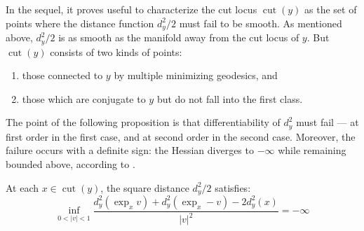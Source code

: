 In the sequel, it proves useful to characterize the cut locus \( \operatorname { cut } ( y ) \) as
the set of points where the distance function \( d _ { y } ^ { 2 } / 2 \) must fail to be smooth.
As mentioned above,
\( d _ { y } ^ { 2 } / 2 \) is as smooth as the manifold away from the cut locus of \( y \).
But \( \operatorname{cut} ( y ) \) consists of two kinds of points:
\begin{enumerate}
	\item those connected to \( y \) by multiple minimizing geodesics, and
	\item	those which are conjugate to \( y \) but do not fall into the first class.
\end{enumerate}
The point of the following proposition \cite[Proposition 2.5]{cordero2001riemannian}
is that differentiability of \( d _ { y } ^ { 2 } \) must fail --- at first order in the first case,
and at second order in the second case.
Moreover, the failure occurs with a definite sign:
the Hessian diverges to $-\infty$ while remaining bounded above, according to .

\begin{prop}
	\label{prop:distance_cut_locus}
	At each \( x \in \operatorname { cut } ( y ) \), the square distance \( d _ { y } ^ { 2 } / 2 \) satisfies:
	\[ \inf _ { 0 < | v | < 1 } \frac { d_y^2 \left( \exp _ { x } v \right) + d_y^2 \left( \exp _ { x } - v \right)
		- 2 d_y^2 ( x ) } { | v | ^ { 2 } } = - \infty \]
\end{prop}
